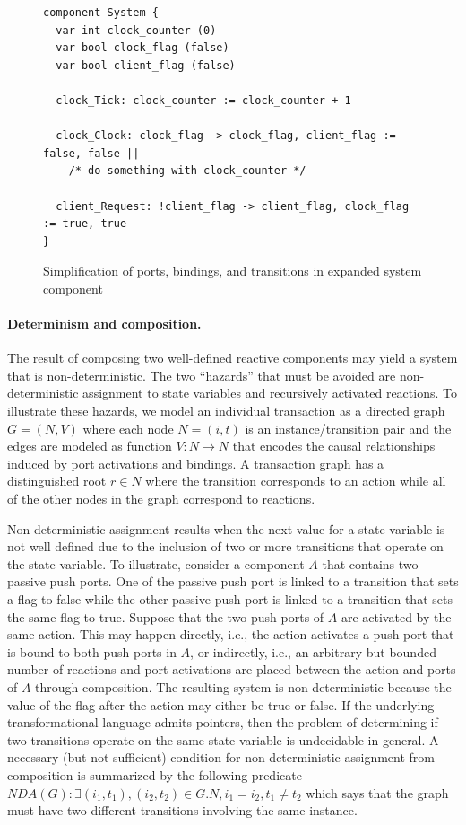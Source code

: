 \begin{figure}
\begin{verbatim}
component System {
  var int clock_counter (0)
  var bool clock_flag (false)
  var bool client_flag (false)

  clock_Tick: clock_counter := clock_counter + 1

  clock_Clock: clock_flag -> clock_flag, client_flag := false, false ||
    /* do something with clock_counter */

  client_Request: !client_flag -> client_flag, clock_flag := true, true
}
\end{verbatim}
\caption{Simplification of ports, bindings, and transitions in expanded system component\label{se2}}
\end{figure}

\paragraph{Determinism and composition.}
The result of composing two well-defined reactive components may yield a system that is non-deterministic.
The two ``hazards'' that must be avoided are non-deterministic assignment to state variables and recursively activated reactions.
To illustrate these hazards, we model an individual transaction as a directed graph $G = (N,V)$ where each node $N=(i,t)$ is an instance/transition pair and the edges are modeled as function $V: N \to N$ that encodes the causal relationships induced by port activations and bindings.
A transaction graph has a distinguished root $r \in N$ where the transition corresponds to an action while all of the other nodes in the graph correspond to reactions.

Non-deterministic assignment results when the next value for a state variable is not well defined due to the inclusion of two or more transitions that operate on the state variable.
To illustrate, consider a component $A$ that contains two passive push ports.
One of the passive push port is linked to a transition that sets a flag to false while the other passive push port is linked to a transition that sets the same flag to true.
Suppose that the two push ports of $A$ are activated by the same action.
This may happen directly, i.e., the action activates a push port that is bound to both push ports in $A$, or indirectly, i.e., an arbitrary but bounded number of reactions and port activations are placed between the action and ports of $A$ through composition.
The resulting system is non-deterministic because the value of the flag after the action may either be true or false.
If the underlying transformational language admits pointers, then the problem of determining if two transitions operate on the same state variable is undecidable in general.
A necessary (but not sufficient) condition for non-deterministic assignment from composition is summarized by the following predicate $NDA(G): \exists (i_1, t_1), (i_2, t_2) \in G.N, i_1 = i_2, t_1 \ne t_2$ which says that the graph must have two different transitions involving the same instance.

